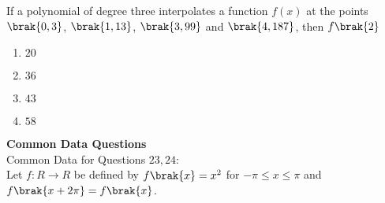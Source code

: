     \item If a polynomial of degree three interpolates a function $f(x)$ at the points $\brak{0,3}$, $\brak{1,13}$, $\brak{3,99}$ and $\brak{4,187}$, then $f\brak{2}$
    \begin{enumerate}
        \item $20$
        \item $36$
        \item $43$
        \item $58$
    \end{enumerate}
    \textbf{Common Data Questions}\\
    Common Data for Questions $23, 24:$\\
    Let $f:R\rightarrow R$ be defined by $f\brak{x}=x^2$ for $-\pi\leq x\leq\pi$ and $f\brak{x+2\pi}=f\brak{x}$.\\
    

